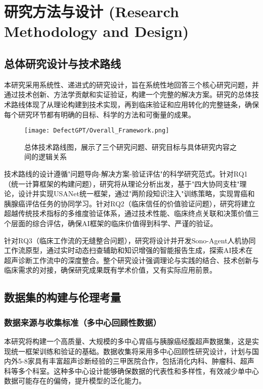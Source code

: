 
\chapter{研究方法与设计 (Research Methodology and Design)} \label{chp:methodology}

\section{总体研究设计与技术路线}

本研究采用系统性、递进式的研究设计，旨在系统性地回答三个核心研究问题，并通过技术创新、方法学贡献和实证验证，构建一个完整的解决方案。研究的总体技术路线体现了从理论构建到技术实现，再到临床验证和应用转化的完整链条，确保每个研究环节都有明确的目标、科学的方法和可衡量的成果。

\begin{figure}[htbp]
\centering
\texttt{[image: DefectGPT/Overall\_Framework.png]}
\caption{总体技术路线图，展示了三个研究问题、研究目标与具体研究内容之间的逻辑关系}
\label{fig:overall_framework}
\end{figure}

技术路线的设计遵循"问题导向-解决方案-验证评估"的科学研究范式。针对RQ1（统一计算框架的构建问题），研究将从理论分析出发，基于"四大协同支柱"理论，设计并实现USANet统一框架，通过"两阶段知识注入"训练策略，实现胃癌和胰腺癌评估任务的协同学习。针对RQ2（临床信任的价值验证问题），研究将建立超越传统技术指标的多维度验证体系，通过技术性能、临床终点关联和决策价值三个层面的综合评估，确保AI框架的临床价值得到科学、严谨的验证。

针对RQ3（临床工作流的无缝整合问题），研究将设计并开发Sono-Agent人机协同工作流原型，通过实时动态扫查辅助和知识增强的智能报告生成，探索AI技术在超声诊断工作流中的深度整合。整个研究设计强调理论与实践的结合、技术创新与临床需求的对接，确保研究成果既有学术价值，又有实际应用前景。

\section{数据集的构建与伦理考量}

\subsection{数据来源与收集标准（多中心回顾性数据）}

本研究将构建一个高质量、大规模的多中心胃癌与胰腺癌经腹超声数据集，这是实现统一框架训练和验证的基础。数据收集将采用多中心回顾性研究设计，计划与国内外5-8家具有丰富超声诊断经验的三甲医院合作，包括消化内科、肿瘤科、超声科等多个科室。这种多中心设计能够确保数据的代表性和多样性，有效减少单中心数据可能存在的偏倚，提升模型的泛化能力。

